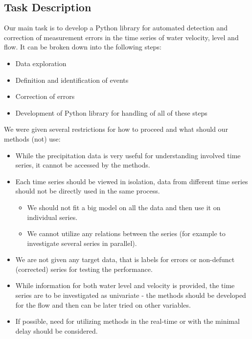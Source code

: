 \documentclass[12pt,a4paper]{article}
\begin{document}
\subsection{Task Description}
Our main task is to develop a Python library for automated detection and correction of  measurement errors in the time series of water velocity, level and flow. It can be broken down into the following steps:
\begin{itemize}
  \item Data exploration
  \item Definition and identification of events
  \item Correction of errors
  \item Development of Python library for handling of all of these steps
\end{itemize}

We were given several restrictions for how to proceed and what should our methods (not) use:
\begin{itemize}
    \item While the precipitation data is very useful for understanding involved time series, it cannot be accessed by the methods.
    \item Each time series should be viewed in isolation, data from different time series should not be directly used in the same process.
    \begin{itemize}
      \item{We should not fit a big model on all the data and then use it on individual series.}
      \item{We cannot utilize any relations between the series (for example to investigate several series in parallel).}
      \end{itemize}
      \item {We are not given any target data, that is labels for errors or non-defunct (corrected) series for testing the performance.}
      \item{While information for both water level and velocity is provided, the time series are to be investigated as univariate - the methods should be developed for the flow and then can be later tried on other variables.}
      \item {If possible, need for utilizing methods in the real-time or with the minimal delay should be considered. }
    
\end{itemize}
\end{document}
